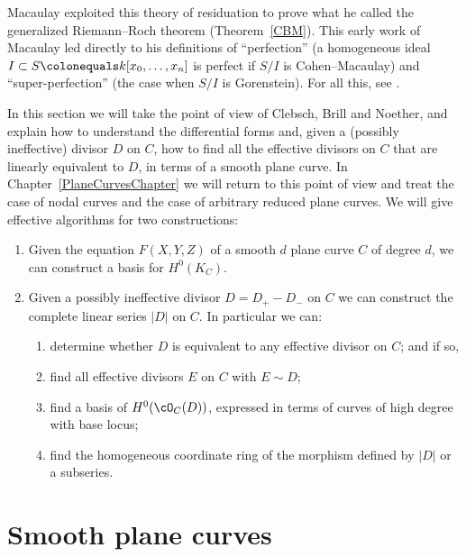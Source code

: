 Macaulay exploited this theory of
residuation
%
to prove what he called
the generalized Riemann--Roch theorem
%
%
(Theorem~\ref{CBM}). This
early work of Mac\-aulay led directly to his definitions of
%
``perfection'' (a homogeneous ideal
$I  \subset S\colonequals k[x_0, \dots, x_n]$ is perfect if $S/I$ is
Cohen--Macaulay)
%
and ``super-perfection'' (the case when $S/I$ is
%
%
Gorenstein). For all this, see \cite{eisenbud-gray}.

In this section we will take the point of view of Clebsch, Brill and Noether, and explain how to understand
the differential forms and, given a (possibly ineffective) divisor $D$ on $C$, how to find all the
effective divisors on $C$ that are linearly equivalent to $D$, in terms of a smooth plane curve. In Chapter~\ref{PlaneCurvesChapter} we will return to this point of view and treat the case of
nodal curves and the case of arbitrary reduced plane curves. We will give effective algorithms for
two constructions:

\begin{enumerate}
\item Given the equation $F(X,Y,Z)$ of a smooth $d$ plane curve $C$
of degree $d$, we can
construct a basis for $H^0(K_C)$.
\item  Given a possibly ineffective divisor $D = D_{+}-D_{-}$ on $C$ we can construct the complete linear series $|D|$ on $C$. In particular we can:
\begin{enumerate}
\item determine whether $D$ is equivalent to any effective divisor on $C$; and if so,
 \item find all effective divisors $E$ on $C$ with $E \sim D$;
 \item find a basis of $H^0(\cO_C(D))$, expressed in terms of curves of high degree with
%
base locus;
 \item find the homogeneous coordinate ring of the morphism defined by $|D|$ or a subseries.
\end{enumerate}
\end{enumerate}

\section{Smooth plane curves}\label{smooth plane curves}

